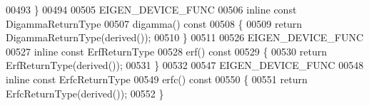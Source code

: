 \begin{DoxyCode}
00493 \}
00494 
00505 EIGEN\_DEVICE\_FUNC
00506 \textcolor{keyword}{inline} \textcolor{keyword}{const} DigammaReturnType
00507 digamma()\textcolor{keyword}{ const}
00508 \textcolor{keyword}{}\{
00509   \textcolor{keywordflow}{return} DigammaReturnType(derived());
00510 \}
00511 
00526 EIGEN\_DEVICE\_FUNC
00527 \textcolor{keyword}{inline} \textcolor{keyword}{const} ErfReturnType
00528 erf()\textcolor{keyword}{ const}
00529 \textcolor{keyword}{}\{
00530   \textcolor{keywordflow}{return} ErfReturnType(derived());
00531 \}
00532 
00547 EIGEN\_DEVICE\_FUNC
00548 \textcolor{keyword}{inline} \textcolor{keyword}{const} ErfcReturnType
00549 erfc()\textcolor{keyword}{ const}
00550 \textcolor{keyword}{}\{
00551   \textcolor{keywordflow}{return} ErfcReturnType(derived());
00552 \}
\end{DoxyCode}
